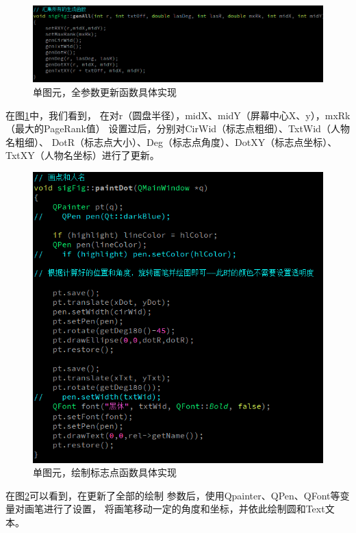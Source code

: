 \documentclass[a4paper,UTF8]{article}
\numberwithin{equation}{section}
\begin{document}
\begin{figure}[htbp]
    \centering
    \includegraphics[width = 15cm]{task6-sigFig-genAll.png}
    \caption{单图元，全参数更新函数具体实现}
    \label{task6-sigFig-genAll}
\end{figure}
在图\ref{task6-sigFig-genAll}中，我们看到，
在对r（圆盘半径），midX、midY（屏幕中心X、y），mxRk（最大的PageRank值）
设置过后，分别对CirWid（标志点粗细）、TxtWid（人物名粗细）、
DotR（标志点大小）、Deg（标志点角度）、DotXY（标志点坐标）、
TxtXY（人物名坐标）进行了更新。
\begin{figure}[htbp]
    \centering
    \includegraphics[width = 15cm]{task6-sigFig-PaintDot.png}
    \caption{单图元，绘制标志点函数具体实现}
    \label{task6-sigFig-PaintDot}
\end{figure}
在图\ref{task6-sigFig-PaintDot}可以看到，在更新了全部的绘制
参数后，使用Qpainter、QPen、QFont等变量对画笔进行了设置，
将画笔移动一定的角度和坐标，并依此绘制圆和Text文本。
\end{document}
